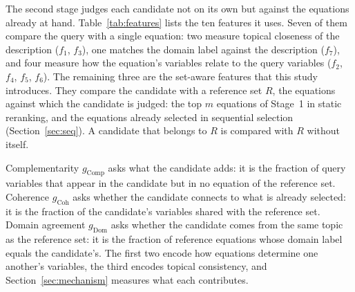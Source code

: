 The second stage judges each candidate not on its own but against the equations already at hand.
Table~\ref{tab:features} lists the ten features it uses. Seven of them compare the query with a
single equation: two measure topical closeness of the description ($f_1$, $f_3$), one matches the
domain label against the description ($f_7$), and four measure how the equation's variables relate
to the query variables ($f_2$, $f_4$, $f_5$, $f_6$). The remaining three are the set-aware features
that this study introduces. They compare the candidate with a reference set $R$, the equations
against which the candidate is judged: the top $m$ equations of Stage~1 in static reranking, and the
equations already selected in sequential selection (Section~\ref{sec:seq}). A candidate that
belongs to $R$ is compared with $R$ without itself.

Complementarity $g_{\mathrm{Comp}}$ asks what the candidate adds: it is the fraction of query
variables that appear in the candidate but in no equation of the reference set. Coherence
$g_{\mathrm{Coh}}$ asks whether the candidate connects to what is already selected: it is the
fraction of the candidate's variables shared with the reference set. Domain agreement
$g_{\mathrm{Dom}}$ asks whether the candidate comes from the same topic as the reference set: it is
the fraction of reference equations whose domain label equals the candidate's. The first two
encode how equations determine one another's variables, the third encodes topical consistency, and
Section~\ref{sec:mechanism} measures what each contributes.

